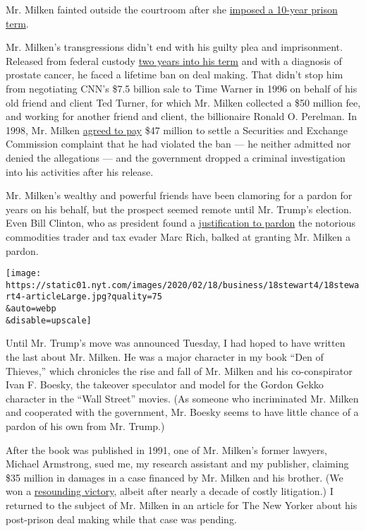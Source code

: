 Mr. Milken fainted outside the courtroom after she
\href{https://www.nytimes.com/1990/11/22/business/the-milken-sentence-milken-gets-10-years-for-wall-st-crimes.html}{imposed
a 10-year prison term}.

Mr. Milken's transgressions didn't end with his guilty plea and
imprisonment. Released from federal custody
\href{https://www.nytimes.com/1993/03/04/business/milken-freed-but-burdened.html}{two
years into his term} and with a diagnosis of prostate cancer, he faced a
lifetime ban on deal making. That didn't stop him from negotiating CNN's
\$7.5 billion sale to Time Warner in 1996 on behalf of his old friend
and client Ted Turner, for which Mr. Milken collected a \$50 million
fee, and working for another friend and client, the billionaire Ronald
O. Perelman. In 1998, Mr. Milken
\href{https://www.nytimes.com/1998/02/27/business/milken-settles-sec-complaint-for-47-million.html}{agreed
to pay} \$47 million to settle a Securities and Exchange Commission
complaint that he had violated the ban --- he neither admitted nor
denied the allegations --- and the government dropped a criminal
investigation into his activities after his release.

Mr. Milken's wealthy and powerful friends have been clamoring for a
pardon for years on his behalf, but the prospect seemed remote until Mr.
Trump's election. Even Bill Clinton, who as president found a
\href{https://www.nytimes.com/2001/01/24/us/influential-backers-helped-commodities-trader-win-pardon.html}{justification
to pardon} the notorious commodities trader and tax evader Marc Rich,
balked at granting Mr. Milken a pardon.

\texttt{[image: https://static01.nyt.com/images/2020/02/18/business/18stewart4/18stewart4-articleLarge.jpg?quality=75\\\&auto=webp\\\&disable=upscale]}

Until Mr. Trump's move was announced Tuesday, I had hoped to have
written the last about Mr. Milken. He was a major character in my book
``Den of Thieves,'' which chronicles the rise and fall of Mr. Milken and
his co-conspirator Ivan F. Boesky, the takeover speculator and model for
the Gordon Gekko character in the ``Wall Street'' movies. (As someone
who incriminated Mr. Milken and cooperated with the government, Mr.
Boesky seems to have little chance of a pardon of his own from Mr.
Trump.)

After the book was published in 1991, one of Mr. Milken's former
lawyers, Michael Armstrong, sued me, my research assistant and my
publisher, claiming \$35 million in damages in a case financed by Mr.
Milken and his brother. (We won a
\href{https://www.nytimes.com/1999/09/24/business/milken-supported-libel-suit-against-a-writer-is-dismissed.html}{resounding
victory}, albeit after nearly a decade of costly litigation.) I returned
to the subject of Mr. Milken in an article for The New Yorker about his
post-prison deal making while that case was pending.

